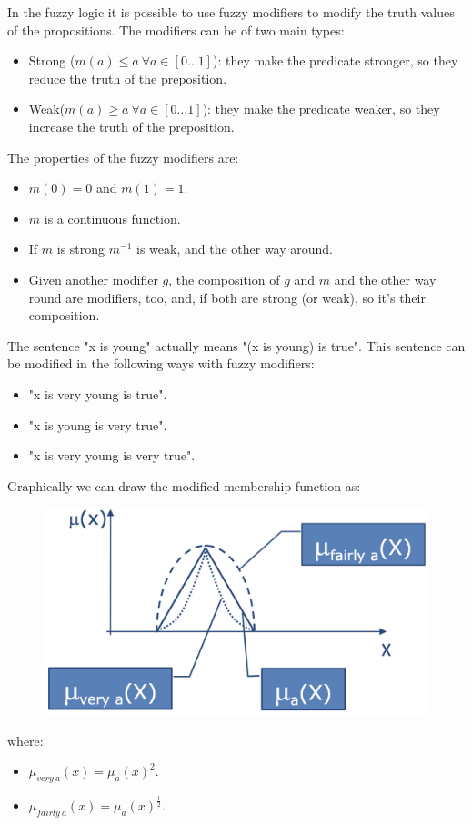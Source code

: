 \documentclass[12pt, a4paper]{report}
\theoremstyle{remark}
\begin{document}
    In the fuzzy logic it is possible to use fuzzy modifiers to modify the truth values of the propositions.     
    The modifiers can be of two main types: 
    \begin{itemize}
        \item Strong ($m(a) \leq a \: \forall a \in [0 \dots 1]$): they make the predicate stronger, so they reduce the truth of the preposition.
        \item Weak($m(a) \geq a \: \forall a \in [0 \dots 1]$): they make the predicate weaker, so they increase the truth of the preposition.
    \end{itemize}
    The properties of the fuzzy modifiers are:
    \begin{itemize}
        \item $m(0)=0$ and $m(1)=1$.
        \item $m$ is a continuous function. 
        \item If $m$ is strong $m^{-1}$ is weak, and the other way around.
        \item Given another modifier $g$, the composition of $g$ and $m$ and the other way round are modifiers, too, and, if both are strong
            (or weak), so it's their composition.
    \end{itemize}
    \begin{example}
        The sentence "x is young" actually means "(x is young) is true". This sentence can be modified in the following ways with fuzzy modifiers:
        \begin{itemize}
            \item "x is very young is true".
            \item "x is young is very true".
            \item "x is very young is very true". 
        \end{itemize}
        Graphically we can draw the modified membership function as: 
        \begin{figure}[H]
            \centering
            \includegraphics[width=0.4\linewidth]{images/modifiers.png}
        \end{figure}
        where: 
        \begin{itemize}
            \item $\mu_{very \: a}(x)=\mu_a(x)^2$.
            \item $\mu_{fairly \: a}(x)=\mu_a(x)^{\frac{1}{2}}$.
        \end{itemize}
    \end{example}
\end{document}
